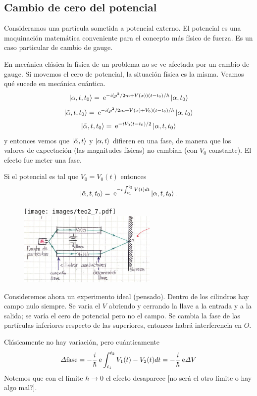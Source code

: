 \documentclass[10pt,oneside]{CBFT_book}
\begin{document}
\subsection{Cambio de cero del potencial}

Consideramos una partícula sometida a potencial externo.
El potencial es una maquinación matemática conveniente para el concepto más físico de fuerza.
Es un caso particular de cambio de gauge.


En mecánica clásica la física de un problema no se ve afectada por un cambio de gauge.
Si movemos el cero de potencial, la situación física es la misma.
Veamos qué sucede en mecánica cuántica.
\[
	\Ket{\alpha,t,t_0} = \:\mathrm{e}^{ -i (p^2/2m + V(x))(t-t_0)/\hbar} \Ket{\alpha,t_0}
\]
\[
	\Ket{\tilde{\alpha},t,t_0} = \:\mathrm{e}^{ -i (p^2/2m + V(x) + V_0)(t-t_0)/\hbar} \Ket{\alpha,t_0}
\]
\[
	\Ket{\tilde{\alpha},t,t_0} = \:\mathrm{e}^{ -i V_0(t-t_0)/2 }\Ket{\alpha,t,t_0}
\]
y entonces vemos que $\Ket{\tilde{\alpha},t}$ y $\Ket{\alpha,t}$ difieren en una fase, de manera que los 
valores de expectación (las magnitudes físicas) no cambian (con $V_0$ constante).
El efecto fue meter una fase.

Si el potencial es tal que $V_0 = V_0(t)$ entonces
\[
	\Ket{\tilde{\alpha},t,t_0} = \:\mathrm{e}^{ -i \int_{t_1}^{t_2} V(t) dt } \Ket{\alpha,t,t_0}.
\]


\begin{figure}[htb]
	\begin{center}
	\texttt{[image: images/teo2\_7.pdf]}
	\includegraphics[width=0.6\textwidth]{images/fig_ft2_cero_potential.jpg}
	\end{center}
	\caption{}
\end{figure} 

Consideremos ahora un experimento ideal (pensado). 
Dentro de los cilindros hay campo nulo siempre. Se varia el $V$ abriendo y cerrando la 
llave a la entrada y a la salida; se varía el cero de potencial pero no el campo.
Se cambia la fase de las partículas inferiores respecto de las superiores, entonces habrá interferencia en 
$O$.

Clásicamente no hay variación, pero cuánticamente
\[
	\Delta \text{fase} = -\frac{i}{\hbar}\:\mathrm{e} \int _{t_1}^{t_2} V_1(t) - V_2(t) dt = 
	-\frac{i}{\hbar}\:\mathrm{e} \Delta V
\]
Notemos que con el límite $\hbar \to 0$ el efecto desaparece [no será el otro límite o hay algo mal?].
\end{document}

